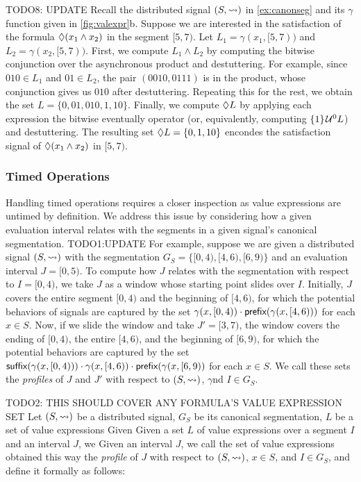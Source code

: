 \begin{example}
	\alert{TODO8: UPDATE}
	Recall the distributed signal $(S, {\rightsquigarrow})$ in \cref{ex:canonseg} and its $\gamma$ function given in \cref{fig:valexpr}b.
	Suppose we are interested in the satisfaction of the formula $\lozenge(x_1 \land x_2)$ in the segment $[5,7)$.
	Let $L_1 = \gamma(x_1, [5,7))$ and $L_2 = \gamma(x_2, [5,7))$.
	First, we compute $L_1 \land L_2$ by computing the bitwise conjunction over the asynchronous product and destuttering.
	For example, since $010 \in L_1$ and $01 \in L_2$, the pair $(0010,0111)$ is in the product, whose conjunction gives us $010$ after destuttering. 
	Repeating this for the rest, we obtain the set $L = \{ 0, 01, 010, 1, 10 \}$.
	Finally, we compute $\lozenge L$ by applying each expression the bitwise eventually operator (or, equivalently, computing $\{1\} \kern.1em\mathcal{U}^0 L$) and destuttering.
	The resulting set $\lozenge L = \{0, 1, 10\}$ encondes the satisfaction signal of $\lozenge(x_1 \land x_2)$ in $[5,7)$.
\end{example}

\subsubsection{Timed Operations}
Handling timed operations requires a closer inspection as value expressions are untimed by definition.
We address this issue by considering how a given evaluation interval relates with the segments in a given signal's canonical segmentation.
\alert{TODO1:UPDATE}
For example, suppose we are given a distributed signal $(S,{\rightsquigarrow})$ with the segmentation $G_S = \{ [0,4), [4,6), [6,9) \}$ and an evaluation interval $J = [0,5)$.
To compute how $J$ relates with the segmentation with respect to $I =[0,4)$, we take $J$ as a window whose starting point slides over $I$.
Initially, $J$ covers the entire segment $[0,4)$ and the beginning of $[4,6)$, for which the potential behaviors of signals are captured by the set $\gamma(x, [0,4)) \cdot \textsf{prefix}(\gamma(x, [4,6)))$ for each $x \in S$.
Now, if we slide the window and take $J' = [3,7)$, the window covers the ending of $[0,4)$, the entire $[4,6)$, and the beginning of $[6,9)$, for which the potential behaviors are captured by the set $\textsf{suffix}(\gamma(x, [0,4))) \cdot \gamma(x, [4,6)) \cdot \textsf{prefix}(\gamma(x, [6,9))$ for each $x \in S$.
We call these sets the \emph{profiles} of $J$ and $J'$ with respect to $(S,{\rightsquigarrow})$, $\gamma$nd $I \in G_S$.

\alert{TODO2: THIS SHOULD COVER ANY FORMULA'S VALUE EXPRESSION SET}
Let $(S,{\rightsquigarrow})$ be a distributed signal, $G_S$ be its canonical segmentation, $L$ be a set of value expressions
Given 
Given a set $L$ of value expressions over a segment $I$ and an interval $J$, we
Given an interval $J$, we call the set of value expressions obtained this way the \emph{profile} of $J$ with respect to $(S,{\rightsquigarrow})$, $x \in S$, and $I \in G_S$, and define it formally as follows:

